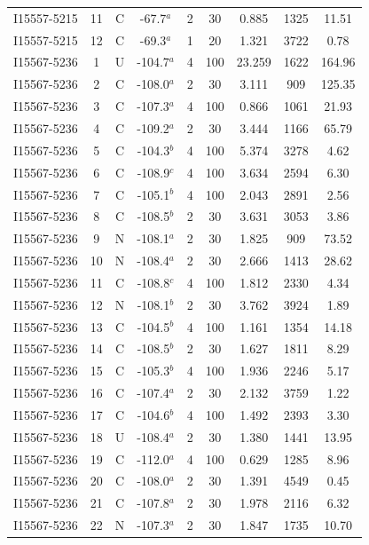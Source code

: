 \begin{table}
\begin{tabular}{ccccccccc}
I15557-5215 & 11 & C & -67.7$^{a}$ & 2 & 30 & 0.885 & 1325 & 11.51 \\
I15557-5215 & 12 & C & -69.3$^{a}$ & 1 & 20 & 1.321 & 3722 & 0.78 \\
I15567-5236 & 1 & U & -104.7$^{a}$ & 4 & 100 & 23.259 & 1622 & 164.96 \\
I15567-5236 & 2 & C & -108.0$^{a}$ & 2 & 30 & 3.111 & 909 & 125.35 \\
I15567-5236 & 3 & C & -107.3$^{a}$ & 4 & 100 & 0.866 & 1061 & 21.93 \\
I15567-5236 & 4 & C & -109.2$^{a}$ & 2 & 30 & 3.444 & 1166 & 65.79 \\
I15567-5236 & 5 & C & -104.3$^{b}$ & 4 & 100 & 5.374 & 3278 & 4.62 \\
I15567-5236 & 6 & C & -108.9$^{c}$ & 4 & 100 & 3.634 & 2594 & 6.30 \\
I15567-5236 & 7 & C & -105.1$^{b}$ & 4 & 100 & 2.043 & 2891 & 2.56 \\
I15567-5236 & 8 & C & -108.5$^{b}$ & 2 & 30 & 3.631 & 3053 & 3.86 \\
I15567-5236 & 9 & N & -108.1$^{a}$ & 2 & 30 & 1.825 & 909 & 73.52 \\
I15567-5236 & 10 & N & -108.4$^{a}$ & 2 & 30 & 2.666 & 1413 & 28.62 \\
I15567-5236 & 11 & C & -108.8$^{c}$ & 4 & 100 & 1.812 & 2330 & 4.34 \\
I15567-5236 & 12 & N & -108.1$^{b}$ & 2 & 30 & 3.762 & 3924 & 1.89 \\
I15567-5236 & 13 & C & -104.5$^{b}$ & 4 & 100 & 1.161 & 1354 & 14.18 \\
I15567-5236 & 14 & C & -108.5$^{b}$ & 2 & 30 & 1.627 & 1811 & 8.29 \\
I15567-5236 & 15 & C & -105.3$^{b}$ & 4 & 100 & 1.936 & 2246 & 5.17 \\
I15567-5236 & 16 & C & -107.4$^{a}$ & 2 & 30 & 2.132 & 3759 & 1.22 \\
I15567-5236 & 17 & C & -104.6$^{b}$ & 4 & 100 & 1.492 & 2393 & 3.30 \\
I15567-5236 & 18 & U & -108.4$^{a}$ & 2 & 30 & 1.380 & 1441 & 13.95 \\
I15567-5236 & 19 & C & -112.0$^{a}$ & 4 & 100 & 0.629 & 1285 & 8.96 \\
I15567-5236 & 20 & C & -108.0$^{a}$ & 2 & 30 & 1.391 & 4549 & 0.45 \\
I15567-5236 & 21 & C & -107.8$^{a}$ & 2 & 30 & 1.978 & 2116 & 6.32 \\
I15567-5236 & 22 & N & -107.3$^{a}$ & 2 & 30 & 1.847 & 1735 & 10.70 \\

\end{tabular}
\end{table}
